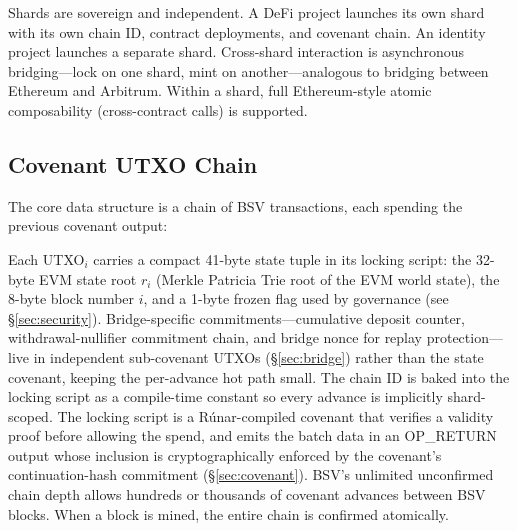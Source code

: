 \documentclass[11pt,twocolumn]{article}
\begin{document}
Shards are sovereign and independent. A DeFi project launches its own shard with its own chain ID, contract deployments, and covenant chain. An identity project launches a separate shard. Cross-shard interaction is asynchronous bridging---lock on one shard, mint on another---analogous to bridging between Ethereum and Arbitrum. Within a shard, full Ethereum-style atomic composability (cross-contract calls) is supported.

\subsection{Covenant UTXO Chain}

The core data structure is a chain of BSV transactions, each spending the previous covenant output:

\begin{center}
\end{center}

\noindent Each UTXO$_i$ carries a compact 41-byte state tuple in its locking script: the 32-byte EVM state root $r_i$ (Merkle Patricia Trie root of the EVM world state), the 8-byte block number $i$, and a 1-byte frozen flag used by governance (see \S\ref{sec:security}). Bridge-specific commitments---cumulative deposit counter, withdrawal-nullifier commitment chain, and bridge nonce for replay protection---live in independent sub-covenant UTXOs (\S\ref{sec:bridge}) rather than the state covenant, keeping the per-advance hot path small. The chain ID is baked into the locking script as a compile-time constant so every advance is implicitly shard-scoped. The locking script is a R\'{u}nar-compiled covenant that verifies a validity proof before allowing the spend, and emits the batch data in an OP\_RETURN output whose inclusion is cryptographically enforced by the covenant's continuation-hash commitment (\S\ref{sec:covenant}). BSV's unlimited unconfirmed chain depth allows hundreds or thousands of covenant advances between BSV blocks. When a block is mined, the entire chain is confirmed atomically.
\end{document}
